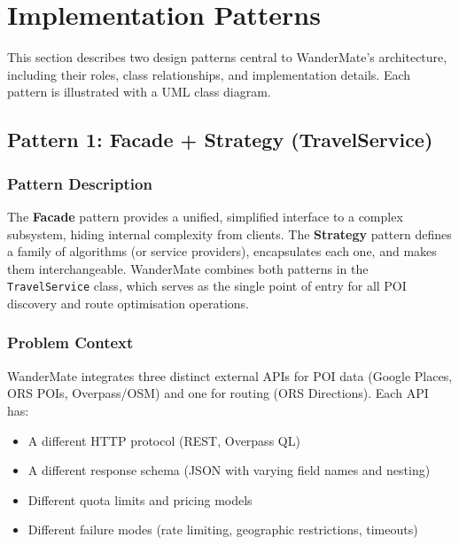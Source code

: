 \documentclass[12pt, a4paper]{article}
\newcommand{\code}[1]{\texttt{\small #1}}
\begin{document}
\section{Implementation Patterns}

This section describes two design patterns central to WanderMate's architecture, including their roles, class relationships, and implementation details. Each pattern is illustrated with a UML class diagram.

\subsection{Pattern 1: Facade + Strategy (TravelService)}

\subsubsection{Pattern Description}

The \textbf{Facade} pattern provides a unified, simplified interface to a complex subsystem, hiding internal complexity from clients. The \textbf{Strategy} pattern defines a family of algorithms (or service providers), encapsulates each one, and makes them interchangeable. WanderMate combines both patterns in the \code{TravelService} class, which serves as the single point of entry for all POI discovery and route optimisation operations.

\subsubsection{Problem Context}

WanderMate integrates three distinct external APIs for POI data (Google Places, ORS POIs, Overpass/OSM) and one for routing (ORS Directions). Each API has:
\begin{itemize}
  \item A different HTTP protocol (REST, Overpass QL)
  \item A different response schema (JSON with varying field names and nesting)
  \item Different quota limits and pricing models
  \item Different failure modes (rate limiting, geographic restrictions, timeouts)
\end{itemize}
\end{document}

